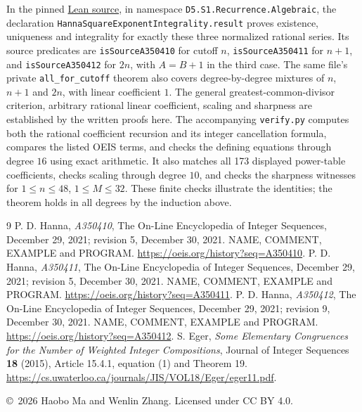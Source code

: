 \documentclass[11pt]{article}
\begin{document}
In the pinned \href{https://github.com/the-omega-institute/trureturing/blob/d75bdd6e258ca112f6f8d8ddce3c6a962cc2049f/D5/S1/Recurrence/Algebraic/HannaSquareExponentIntegrality.lean}{Lean source},
in namespace \texttt{D5.S1.Recurrence.Algebraic}, the declaration
\texttt{HannaSquareExponentIntegrality.result} proves existence,
uniqueness and integrality for exactly these three normalized rational series.
Its source predicates are \texttt{isSourceA350410} for cutoff $n$,
\texttt{isSourceA350411} for $n+1$, and \texttt{isSourceA350412} for $2n$,
with $A=B+1$ in the third case.
The same file's private \texttt{all\_for\_cutoff} theorem also covers
degree-by-degree mixtures of $n$, $n+1$ and $2n$, with linear coefficient $1$.
The general greatest-common-divisor criterion, arbitrary rational linear
coefficient, scaling and sharpness are established by the written proofs here.
The accompanying \texttt{verify.py} computes both the rational coefficient
recursion and its integer cancellation formula, compares the listed OEIS terms,
and checks the defining equations through degree $16$ using exact arithmetic.
It also matches all 173 displayed power-table coefficients, checks scaling
through degree $10$, and checks the sharpness witnesses for
$1\leq n\leq48$, $1\leq M\leq32$.
These finite checks illustrate the identities; the theorem holds in all degrees
by the induction above.

\begingroup\small
\begin{thebibliography}{9}
 P. D. Hanna,
\emph{A350410}, The On-Line Encyclopedia of Integer Sequences,
December 29, 2021; revision 5, December 30, 2021.
NAME, COMMENT, EXAMPLE and PROGRAM.
\url{https://oeis.org/history?seq=A350410}.
 P. D. Hanna,
\emph{A350411}, The On-Line Encyclopedia of Integer Sequences,
December 29, 2021; revision 5, December 30, 2021.
NAME, COMMENT, EXAMPLE and PROGRAM.
\url{https://oeis.org/history?seq=A350411}.
 P. D. Hanna,
\emph{A350412}, The On-Line Encyclopedia of Integer Sequences,
December 29, 2021; revision 9, December 30, 2021.
NAME, COMMENT, EXAMPLE and PROGRAM.
\url{https://oeis.org/history?seq=A350412}.
 S. Eger,
\emph{Some Elementary Congruences for the Number of Weighted Integer
Compositions}, Journal of Integer Sequences \textbf{18} (2015),
Article 15.4.1, equation (1) and Theorem 19.
\url{https://cs.uwaterloo.ca/journals/JIS/VOL18/Eger/eger11.pdf}.
\end{thebibliography}
\endgroup
\smallskip\noindent\small
\copyright\ 2026 Haobo Ma and Wenlin Zhang.
Licensed under CC BY 4.0.
\end{document}
